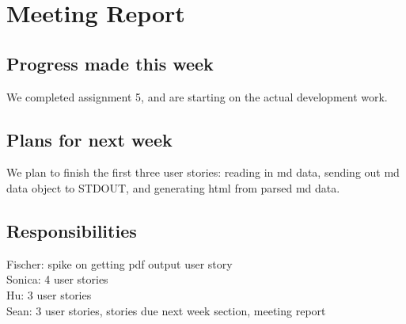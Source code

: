 \section{Meeting Report}

\subsection{Progress made this week}
We completed assignment 5, and are starting on the actual development work.

\subsection{Plans for next week}
We plan to finish the first three user stories: reading in md data, sending out md data object to STDOUT, and generating html from parsed md data.

\subsection{Responsibilities}
Fischer: spike on getting pdf output user story\\
Sonica: 4 user stories\\
Hu: 3 user stories\\
Sean: 3 user stories, stories due next week section, meeting report\\
